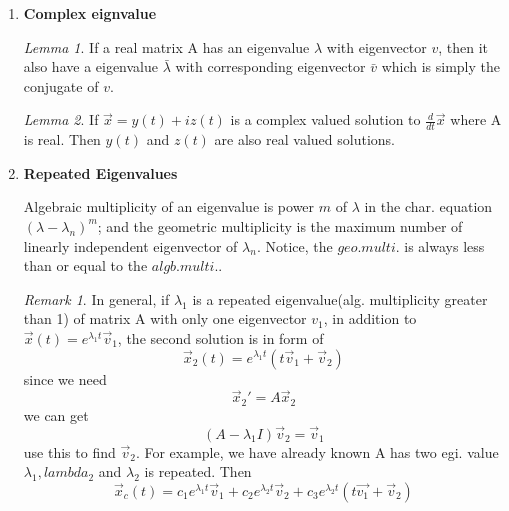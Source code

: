\documentclass[9pt]{article}
\theoremstyle{definition}
\newenvironment{changemargin}[2]{%
  \begin{list}{}{%
    \setlength{\topsep}{0pt}%
    \setlength{\leftmargin}{#1}%
    \setlength{\rightmargin}{#2}%
    \setlength{\listparindent}{\parindent}%
    \setlength{\itemindent}{\parindent}%
    \setlength{\parsep}{\parskip}%
  }%
  \item[]}{\end{list}}
\theoremstyle{theorem}
\theoremstyle{remark}
\newtheorem{remark}{Remark}
\theoremstyle{lemma}
\newtheorem{lemma}{Lemma}
\begin{document}
\begin{changemargin}{-0.125in}{0in}
\begin{enumerate}
        \begin{enumerate}
        
        \medskip
        
        \item \textbf{Complex eignvalue} 
        
        \smallskip
        
        \begin{lemma}
        	If a real matrix A has an eigenvalue $\lambda$ with eigenvector $v$, then it also have a eigenvalue $\bar{\lambda}$ with corresponding eigenvector $\bar{v}$ which is simply the conjugate of $v$.
        \end{lemma}
        
        \smallskip
        
        \begin{lemma}
        	
        	If $\overrightarrow{x} = y(t) + iz(t)$ is a complex valued solution to $\frac{d}{dt}\overrightarrow{x}$ where A is real. Then $y(t)$ and $z(t)$ are also real valued solutions. 
        \end{lemma}
        
        \medskip
        
        \item \textbf{Repeated Eigenvalues}
        
        \smallskip
        
        Algebraic multiplicity of an eigenvalue is power $m$ of $\lambda$ in the char. equation $(\lambda - \lambda_n)^m$; and the geometric multiplicity is the maximum number of linearly independent eigenvector of $\lambda_n$. Notice, the $geo. multi.$ is always less than or equal to the $algb. multi.$.  
        
        \smallskip
       
       \begin{remark}
       	In general, if $\lambda_1$ is a repeated eigenvalue(alg. multiplicity greater than 1) of matrix A with only one eigenvector $v_1$, in addition to $\overrightarrow{x}(t) = e^{\lambda_1 t}\overrightarrow{v}_1$, the second solution is in form of 
       	\[
       	\overrightarrow{x}_2(t) = e^{\lambda_1 t}(t\overrightarrow{v}_1 + \overrightarrow{v}_2)
       	\]
       	since we need 
       	\[
       	\overrightarrow{x}_2' = A\overrightarrow{x}_2
       	\]
       	we can get 
       	\[
       	(A - \lambda_1 I)\overrightarrow{v}_2 = \overrightarrow{v}_1
       	\]
       	use this to find $\overrightarrow{v}_2$. For example, we have already known A has two egi. value $\lambda_1, lambda_2$ and $\lambda_2$ is repeated. Then 
       	\[
       	\overrightarrow{x}_c(t) = c_1e^{\lambda_1 t}\overrightarrow{v}_1 + c_2e^{\lambda_2 t}\overrightarrow{v}_2 + c_3e^{\lambda_2 t}(t\overrightarrow{v_1} + \overrightarrow{v}_2)
       	\]
       \end{remark}
        

\end{enumerate}
\end{enumerate}
\end{changemargin}
\end{document}
